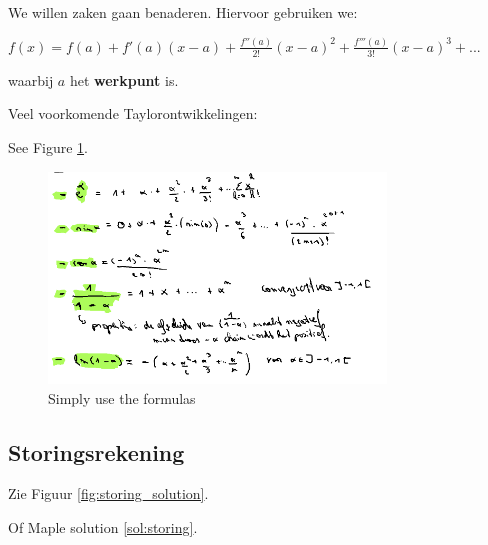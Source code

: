 \documentclass[a4paper]{article}
\begin{document}
We willen zaken gaan benaderen. Hiervoor gebruiken we:

$ f(x) = f(a) + f'(a)(x-a) + \frac{f''(a)}{2!}(x-a)^2 + \frac{f'''(a)}{3!}(x-a)^3 + ... $

waarbij $a$ het \textbf{werkpunt} is.

Veel voorkomende Taylorontwikkelingen:

See Figure \ref{fig:veel_voorkomend_taylor}.

\begin{figure}[htbp!]
	\centering
	\includegraphics[width=0.8\textwidth]{assets/veel_voorkomend_taylor.png}
	\caption{Simply use the formulas}
	\label{fig:veel_voorkomend_taylor}
\end{figure}

\subsection*{Storingsrekening}

Zie Figuur \ref{fig:storing_solution}.

Of Maple solution \ref{sol:storing}.
\end{document}
